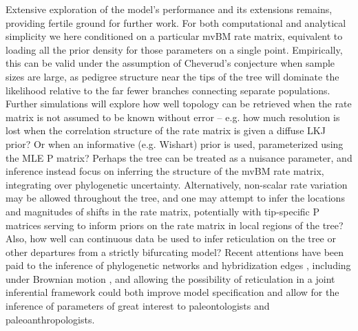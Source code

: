 Extensive exploration of the model’s performance and its extensions remains, providing fertile ground for further work. For both computational and analytical simplicity we here conditioned on a particular mvBM rate matrix, equivalent to loading all the prior density for those parameters on a single point. Empirically, this can be valid under the assumption of Cheverud’s conjecture when sample sizes are large, as pedigree structure near the tips of the tree will dominate the likelihood relative to the far fewer branches connecting separate populations. Further simulations will explore how well topology can be retrieved when the rate matrix is not assumed to be known without error – e.g. how much resolution is lost when the correlation structure of the rate matrix is given a diffuse LKJ prior? Or when an informative (e.g. Wishart) prior is used, parameterized using the MLE P matrix? Perhaps the tree can be treated as a nuisance parameter, and inference instead focus on inferring the structure of the mvBM rate matrix, integrating over phylogenetic uncertainty. Alternatively, non-scalar rate variation may be allowed throughout the tree, and one may attempt to infer the locations and magnitudes of shifts in the rate matrix, potentially with tip-specific P matrices serving to inform priors on the rate matrix in local regions of the tree? Also, how well can continuous data be used to infer reticulation on the tree or other departures from a strictly bifurcating model? Recent attentions have been paid to the inference of phylogenetic networks and hybridization edges \citep[e.g. ][]{wenBayesianInferenceReticulate2016, wenCoestimatingReticulatePhylogenies2018}, including under Brownian motion \citep{pickrellInferencePopulationSplits2012}, and allowing the possibility of reticulation in a joint inferential framework could both improve model specification and allow for the inference of parameters of great interest to paleontologists and paleoanthropologists.

